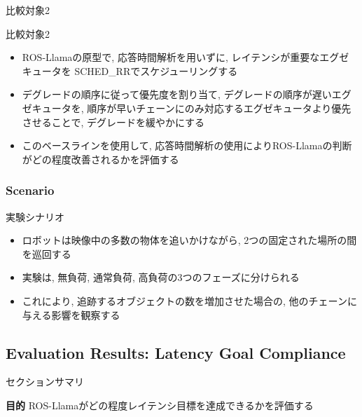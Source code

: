 \begin{frame}{比較対象2}
    \begin{block}{比較対象2}
        \begin{itemize}
            \item ROS-Llamaの原型で, 応答時間解析を用いずに, レイテンシが重要なエグゼキュータを SCHED\_RRでスケジューリングする
            \item デグレードの順序に従って優先度を割り当て, デグレードの順序が遅いエグゼキュータを, 順序が早いチェーンにのみ対応するエグゼキュータより優先させることで, デグレードを緩やかにする
        \end{itemize}
    \end{block}
    \vspace{5mm}
    \begin{itemize}
        \item このベースラインを使用して, 応答時間解析の使用によりROS-Llamaの判断がどの程度改善されるかを評価する
    \end{itemize}
\end{frame}


\subsubsection{Scenario}
\label{sssec: scenario}

\begin{frame}{実験シナリオ}
    \begin{itemize}
        \item ロボットは映像中の多数の物体を追いかけながら, 2つの固定された場所の間を巡回する
        \item 実験は, 無負荷, 通常負荷, 高負荷の3つのフェーズに分けられる
        \item これにより, 追跡するオブジェクトの数を増加させた場合の, 他のチェーンに与える影響を観察する
    \end{itemize}
\end{frame}


\subsection{Evaluation Results: Latency Goal Compliance}
\label{ssec: evaluation results: latency goal compliance}

\begin{frame}{セクションサマリ}
    \begin{itembox}[l]{\textbf{目的}}
        ROS-Llamaがどの程度レイテンシ目標を達成できるかを評価する
    \end{itembox}
\end{frame}

